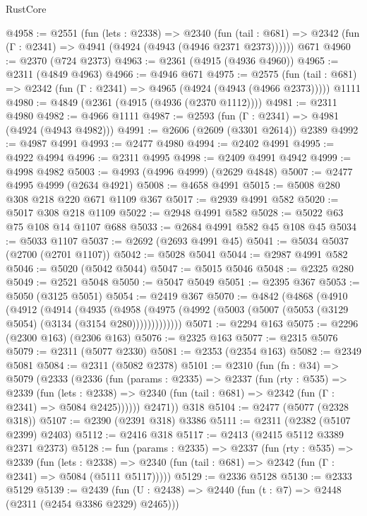 \begin{lexlean}{RustCore}
\begin{coremodule}
@4958 := @2551
    (fun (lets : @2338) =>
    @2340
      (fun (tail : @681) => @2342 (fun (Γ : @2341) => @4941 (@4924 (@4943 (@4946 @2371 @2373))))))
    @671
@4960 := @2370 (@724 @2373)
@4963 := @2361 (@4915 (@4936 @4960))
@4965 := @2311 (@4849 @4963)
@4966 := @4946 @671
@4975 := @2575
    (fun (tail : @681) => @2342 (fun (Γ : @2341) => @4965 (@4924 (@4943 (@4966 @2373)))))
    @1111
@4980 := @4849 (@2361 (@4915 (@4936 (@2370 @1112))))
@4981 := @2311 @4980
@4982 := @4966 @1111
@4987 := @2593 (fun (Γ : @2341) => @4981 (@4924 (@4943 @4982)))
@4991 := @2606 (@2609 (@3301 @2614)) @2389
@4992 := @4987 @4991
@4993 := @2477 @4980
@4994 := @2402 @4991
@4995 := @4922 @4994
@4996 := @2311 @4995
@4998 := @2409 @4991 @4942
@4999 := @4998 @4982
@5003 := @4993 (@4996 @4999) (@2629 @4848)
@5007 := @2477 @4995 @4999 (@2634 @4921)
@5008 := @4658 @4991
@5015 := @5008 @280 @308 @218 @220 @671 @1109 @367
@5017 := @2939 @4991 @582
@5020 := @5017 @308 @218 @1109
@5022 := @2948 @4991 @582
@5028 := @5022 @63 @75 @108 @14 @1107 @688
@5033 := @2684 @4991 @582 @45 @108 @45
@5034 := @5033 @1107
@5037 := @2692 (@2693 @4991 @45)
@5041 := @5034 @5037 (@2700 (@2701 @1107))
@5042 := @5028 @5041
@5044 := @2987 @4991 @582
@5046 := @5020 (@5042 @5044)
@5047 := @5015 @5046
@5048 := @2325 @280
@5049 := @2521 @5048
@5050 := @5047 @5049
@5051 := @2395 @367
@5053 := @5050 (@3125 @5051)
@5054 := @2419 @367
@5070 := @4842
    (@4868
      (@4910
        (@4912
          (@4914
            (@4935
              (@4958
                (@4975 (@4992 (@5003 (@5007 (@5053 (@3129 @5054) (@3134 (@3154 @280)))))))))))))
@5071 := @2294 @163
@5075 := @2296 (@2300 @163) (@2306 @163)
@5076 := @2325 @163
@5077 := @2315 @5076
@5079 := @2311 (@5077 @2330)
@5081 := @2353 (@2354 @163)
@5082 := @2349 @5081
@5084 := @2311 (@5082 @2378)
@5101 := @2310
    (fun (fn : @34) =>
    @5079
      (@2333
        (@2336
          (fun (params : @2335) =>
          @2337
            (fun (rty : @535) =>
            @2339
              (fun (lets : @2338) =>
              @2340 (fun (tail : @681) => @2342 (fun (Γ : @2341) => @5084 @2425))))))
        @2471))
    @318
@5104 := @2477 (@5077 (@2328 @318))
@5107 := @2390 (@2391 @318) @3386
@5111 := @2311 (@2382 (@5107 @2399) @2403)
@5112 := @2416 @318
@5117 := @2413 (@2415 @5112 @3389 @2371 @2373)
@5128 := fun (params : @2335) =>
  @2337
    (fun (rty : @535) =>
    @2339
      (fun (lets : @2338) =>
      @2340 (fun (tail : @681) => @2342 (fun (Γ : @2341) => @5084 (@5111 @5117)))))
@5129 := @2336 @5128
@5130 := @2333 @5129
@5139 := @2439 (fun (U : @2438) => @2440 (fun (t : @7) => @2448 (@2311 (@2454 @3386 @2329) @2465)))

\end{coremodule}
\end{lexlean}
